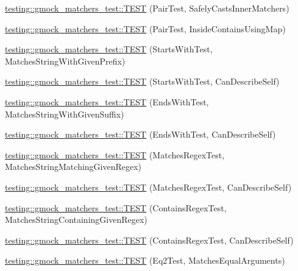 \begin{DoxyCompactItemize}
\item 
\hyperlink{namespacetesting_1_1gmock__matchers__test_ad2110445fe8f2f8ca947540f2a400228}{testing\+::gmock\+\_\+matchers\+\_\+test\+::\+T\+E\+ST} (Pair\+Test, Safely\+Casts\+Inner\+Matchers)
\item 
\hyperlink{namespacetesting_1_1gmock__matchers__test_a9785412a9e786b1f81387204df577c73}{testing\+::gmock\+\_\+matchers\+\_\+test\+::\+T\+E\+ST} (Pair\+Test, Inside\+Contains\+Using\+Map)
\item 
\hyperlink{namespacetesting_1_1gmock__matchers__test_ac8a66c592ff57cce28b6f1d5211fd370}{testing\+::gmock\+\_\+matchers\+\_\+test\+::\+T\+E\+ST} (Starts\+With\+Test, Matches\+String\+With\+Given\+Prefix)
\item 
\hyperlink{namespacetesting_1_1gmock__matchers__test_a492143bbe0627c563c5d0c65bf3f4d5b}{testing\+::gmock\+\_\+matchers\+\_\+test\+::\+T\+E\+ST} (Starts\+With\+Test, Can\+Describe\+Self)
\item 
\hyperlink{namespacetesting_1_1gmock__matchers__test_ac3d41540d2ae7956d33c9eae1be67d91}{testing\+::gmock\+\_\+matchers\+\_\+test\+::\+T\+E\+ST} (Ends\+With\+Test, Matches\+String\+With\+Given\+Suffix)
\item 
\hyperlink{namespacetesting_1_1gmock__matchers__test_a80da065ed9f5fb87add88ae2bc14056d}{testing\+::gmock\+\_\+matchers\+\_\+test\+::\+T\+E\+ST} (Ends\+With\+Test, Can\+Describe\+Self)
\item 
\hyperlink{namespacetesting_1_1gmock__matchers__test_a5983e981b59498c6427ddb183c414bb7}{testing\+::gmock\+\_\+matchers\+\_\+test\+::\+T\+E\+ST} (Matches\+Regex\+Test, Matches\+String\+Matching\+Given\+Regex)
\item 
\hyperlink{namespacetesting_1_1gmock__matchers__test_acb4e75ec699fe1bc178e7ec32fb479c8}{testing\+::gmock\+\_\+matchers\+\_\+test\+::\+T\+E\+ST} (Matches\+Regex\+Test, Can\+Describe\+Self)
\item 
\hyperlink{namespacetesting_1_1gmock__matchers__test_a0a23f3ff8f97ccf74cd64673edc6694f}{testing\+::gmock\+\_\+matchers\+\_\+test\+::\+T\+E\+ST} (Contains\+Regex\+Test, Matches\+String\+Containing\+Given\+Regex)
\item 
\hyperlink{namespacetesting_1_1gmock__matchers__test_ac3d469a146dec0c6ede2b46ff992c8d7}{testing\+::gmock\+\_\+matchers\+\_\+test\+::\+T\+E\+ST} (Contains\+Regex\+Test, Can\+Describe\+Self)
\item 
\hyperlink{namespacetesting_1_1gmock__matchers__test_a768adf8450910e4c3ac0cb2caec8a4c2}{testing\+::gmock\+\_\+matchers\+\_\+test\+::\+T\+E\+ST} (Eq2\+Test, Matches\+Equal\+Arguments)

\end{DoxyCompactItemize}
